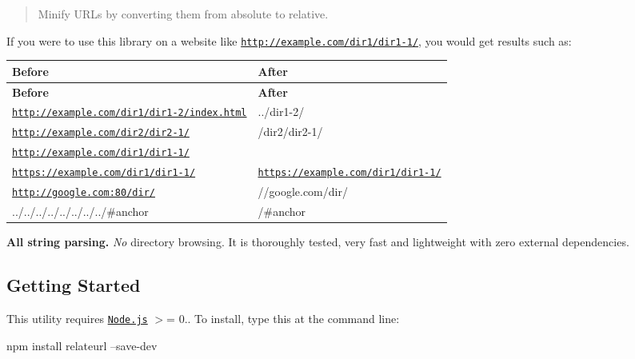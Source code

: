 \begin{quote}
Minify U\+R\+Ls by converting them from absolute to relative. \end{quote}


If you were to use this library on a website like {\ttfamily \href{http://example.com/dir1/dir1-1/}{\tt http\+://example.\+com/dir1/dir1-\/1/}}, you would get results such as\+:

\tabulinesep=1mm
\begin{longtabu} spread 0pt [c]{*{2}{|X[-1]}|}
\hline
\rowcolor{\tableheadbgcolor}\textbf{ Before  }&\textbf{ After   }\\
\endfirsthead
\hline
\endfoot
\hline
\rowcolor{\tableheadbgcolor}\textbf{ Before  }&\textbf{ After   }\\
\endhead
{\ttfamily \href{http://example.com/dir1/dir1-2/index.html}{\tt http\+://example.\+com/dir1/dir1-\/2/index.\+html}}  &{\ttfamily ../dir1-\/2/}   \\
{\ttfamily \href{http://example.com/dir2/dir2-1/}{\tt http\+://example.\+com/dir2/dir2-\/1/}}  &{\ttfamily /dir2/dir2-\/1/}   \\
{\ttfamily \href{http://example.com/dir1/dir1-1/}{\tt http\+://example.\+com/dir1/dir1-\/1/}}  &\\
{\ttfamily \href{https://example.com/dir1/dir1-1/}{\tt https\+://example.\+com/dir1/dir1-\/1/}}  &{\ttfamily \href{https://example.com/dir1/dir1-1/}{\tt https\+://example.\+com/dir1/dir1-\/1/}}   \\
{\ttfamily \href{http://google.com:80/dir/}{\tt http\+://google.\+com\+:80/dir/}}  &{\ttfamily //google.com/dir/}   \\
{\ttfamily ../../../../../../../../\#anchor}  &{\ttfamily /\#anchor}   \\
\end{longtabu}


{\bfseries All string parsing.} {\itshape No} directory browsing. It is thoroughly tested, very fast and lightweight with zero external dependencies.

\subsection*{Getting Started}

This utility requires \href{http://nodejs.org/}{\tt Node.\+js} {\ttfamily $>$= 0.}. To install, type this at the command line\+: 
\begin{DoxyCode}
npm install relateurl --save-dev
\end{DoxyCode}


